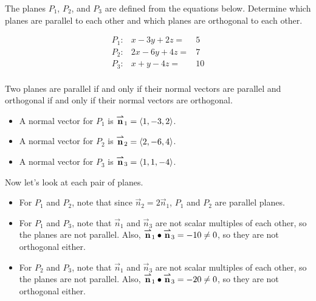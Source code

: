\documentclass[noauthor]{ximera}
\begin{document}
\begin{problem}
The planes $P_1$, $P_2$, and $P_3$ are defined from the equations below.  Determine which planes are parallel to each other and which planes are orthogonal to each other.

\[
\begin{array}{lrc}
P_1 : &  x-3y+2z  = & 5 \\
P_2 : &  2x-6y+4z  =& 7 \\
P_3 : &  x+y-4z =& 10 \\
\end{array}
\]

\begin{freeResponse}
Two planes are parallel if and only if their normal vectors are parallel and orthogonal if and only if their normal vectors are orthogonal.  

\begin{itemize}
\item A normal vector for $P_1$ is ${\overset{\boldsymbol{\rightharpoonup}}{\mathbf{n}}}_1 = \left\langle 1,-3,2\right\rangle$.
\item A normal vector for $P_2$ is ${\overset{\boldsymbol{\rightharpoonup}}{\mathbf{n}}}_2 = \left\langle 2,-6,4\right\rangle$.
\item A normal vector for $P_3$ is ${\overset{\boldsymbol{\rightharpoonup}}{\mathbf{n}}}_3 = \left\langle 1,1,-4\right\rangle$.
\end{itemize}

Now let's look at each pair of planes.

\begin{itemize}
\item For $P_1$ and $P_2$, note that since $\vec{n}_2 = 2 \vec{n}_1$, $P_1$ and $P_2$ are parallel planes.
\item For $P_1$ and $P_3$, note that $\vec{n}_1$ and $\vec{n}_3$ are not scalar multiples of each other, so the planes are not parallel.  Also, ${\overset{\boldsymbol{\rightharpoonup}}{\mathbf{n}}}_1 \bullet {\overset{\boldsymbol{\rightharpoonup}}{\mathbf{n}}}_3 = -10 \neq 0$, so they are not orthogonal either.
\item For $P_2$ and $P_3$, note that $\vec{n}_1$ and $\vec{n}_3$ are not scalar multiples of each other, so the planes are not parallel.  Also, ${\overset{\boldsymbol{\rightharpoonup}}{\mathbf{n}}}_1 \bullet {\overset{\boldsymbol{\rightharpoonup}}{\mathbf{n}}}_3 = -20 \neq 0$, so they are not orthogonal either.
\end{itemize}


\end{freeResponse}
\end{problem}
\end{document}
